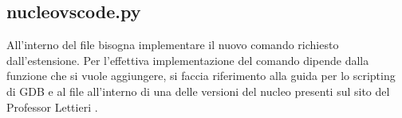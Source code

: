\subsection{nucleo\textunderscore vscode.py}
All'interno del file  bisogna implementare il nuovo comando richiesto dall'estensione. Per l'effettiva implementazione del comando dipende dalla funzione che si vuole aggiungere, si faccia riferimento alla guida per lo scripting di GDB\cite{GDBpython} e al file  all'interno di una delle versioni del nucleo presenti sul sito del Professor Lettieri \cite{testiEsame}.  


%
%
